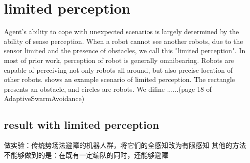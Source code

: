 \section{limited perception}

Agent's ability to cope with unexpected scenarios is largely determined by the ability of sense perception\cite{Distributed adaptive swarm for obstacle avoidance}. 
When a robot cannot see another robots, due to the sensor limited and the presence of obstacles, we call this "limited perception".
In most of prior work, perception of robot is generally omnibearing. 
Robots are capable of perceiving not only robots all-around, but also precise location of other robots\cite{}.
\figurename{} shows an example scenario of  limited perception. The rectangle presents an obstacle, and circles are robots.
We difine ......(page 18 of AdaptiveSwarmAvoidance)

\subsection{result with limited perception}
做实验：传统势场法避障的机器人群，将它们的全感知改为有限感知
其他的方法不能够做到的是：在既有一定编队的同时，还能够避障
